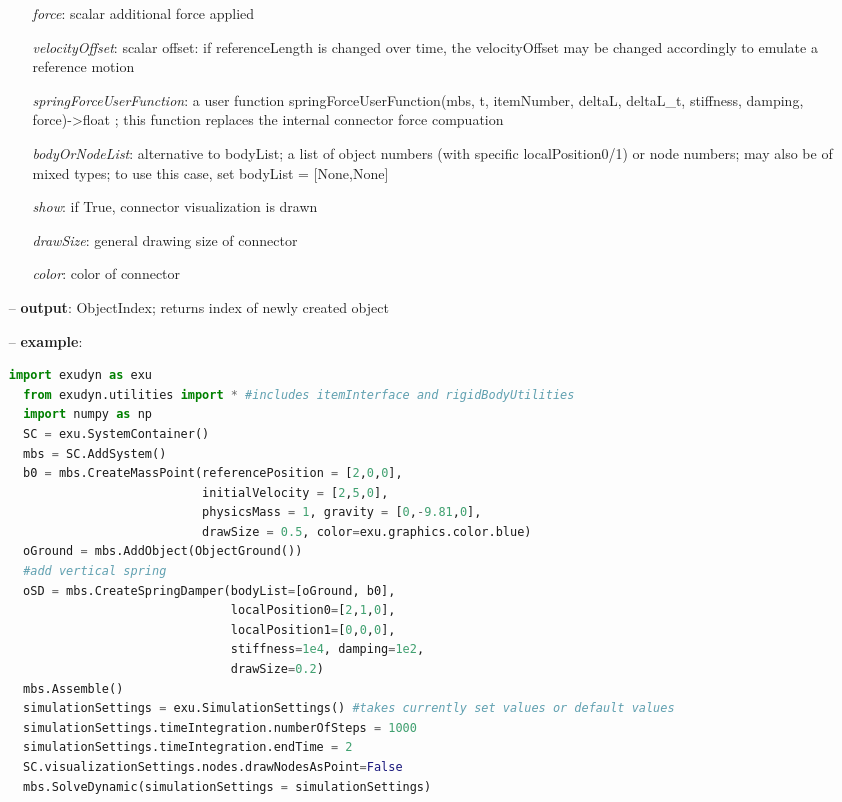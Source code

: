 \begin{itemize}[leftmargin=0.7cm]
\begin{itemize}[leftmargin=1.2cm]
\item[]{\it force}: scalar additional force applied
\item[]{\it velocityOffset}: scalar offset: if referenceLength is changed over time, the velocityOffset may be changed accordingly to emulate a reference motion
\item[]{\it springForceUserFunction}: a user function springForceUserFunction(mbs, t, itemNumber, deltaL, deltaL\_t, stiffness, damping, force)->float ; this function replaces the internal connector force compuation
\item[]{\it bodyOrNodeList}: alternative to bodyList; a list of object numbers (with specific localPosition0/1) or node numbers; may also be of mixed types; to use this case, set bodyList = [None,None]
\item[]{\it show}: if True, connector visualization is drawn
\item[]{\it drawSize}: general drawing size of connector
\item[]{\it color}: color of connector
\end{itemize}
\item[--]
{\bf output}: ObjectIndex; returns index of newly created object
\item[--]
{\bf example}: \vspace{-12pt}\ei\begin{lstlisting}[language=Python, xleftmargin=36pt]
  import exudyn as exu
  from exudyn.utilities import * #includes itemInterface and rigidBodyUtilities
  import numpy as np
  SC = exu.SystemContainer()
  mbs = SC.AddSystem()
  b0 = mbs.CreateMassPoint(referencePosition = [2,0,0],
                           initialVelocity = [2,5,0],
                           physicsMass = 1, gravity = [0,-9.81,0],
                           drawSize = 0.5, color=exu.graphics.color.blue)
  oGround = mbs.AddObject(ObjectGround())
  #add vertical spring
  oSD = mbs.CreateSpringDamper(bodyList=[oGround, b0],
                               localPosition0=[2,1,0],
                               localPosition1=[0,0,0],
                               stiffness=1e4, damping=1e2,
                               drawSize=0.2)
  mbs.Assemble()
  simulationSettings = exu.SimulationSettings() #takes currently set values or default values
  simulationSettings.timeIntegration.numberOfSteps = 1000
  simulationSettings.timeIntegration.endTime = 2
  SC.visualizationSettings.nodes.drawNodesAsPoint=False
  mbs.SolveDynamic(simulationSettings = simulationSettings)
\end{lstlisting}\vspace{-24pt}\bi\item[]\vspace{-24pt}\vspace{12pt}\end{itemize}
%

